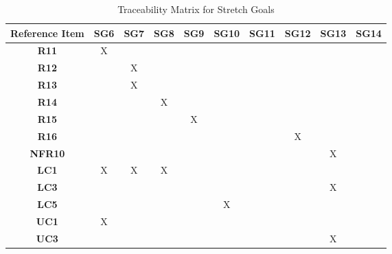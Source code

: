 \begin{table}[ht]
\centering
\begin{tabular}{|c|c|c|c|c|c|c|c|c|c|}
\hline
\textbf{Reference Item} & \textbf{SG6} & \textbf{SG7} & \textbf{SG8} & \textbf{SG9} & \textbf{SG10} & \textbf{SG11} & \textbf{SG12} & \textbf{SG13} & \textbf{SG14} \\ \hline
\textbf{R11} &X & & & & & & & & \\ \hline
\textbf{R12} & &X & & & & & & & \\ \hline
\textbf{R13} & &X & & & & & & & \\ \hline
\textbf{R14} & & &X & & & & & & \\ \hline
\textbf{R15} & & & &X & & & & & \\ \hline
\textbf{R16} & & & & & & &X & & \\ \hline
\textbf{NFR10} & & & & & & & &X & \\ \hline
\textbf{LC1} &X &X &X & & & & & & \\ \hline
\textbf{LC3} & & & & & & & &X & \\ \hline
\textbf{LC5} & & & & &X & & & & \\ \hline
\textbf{UC1} &X & & & & & & & & \\ \hline
\textbf{UC3} & & & & & & & &X & \\ \hline
\end{tabular}
\caption{Traceability Matrix for Stretch Goals}
\label{table:stretch_goals_traceability}
\end{table}